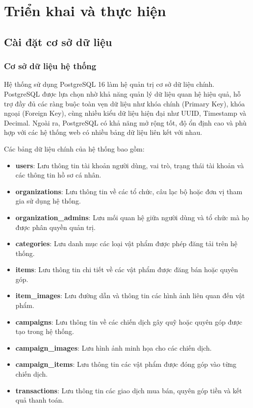\documentclass[12pt,a4paper]{report}
\begin{document}
\chapter{Triển khai và thực hiện}

\section{Cài đặt cơ sở dữ liệu}

\subsection{Cơ sở dữ liệu hệ thống}

Hệ thống sử dụng PostgreSQL 16 làm hệ quản trị cơ sở dữ liệu chính. PostgreSQL được lựa chọn nhờ khả năng quản lý dữ liệu quan hệ hiệu quả, hỗ trợ đầy đủ các ràng buộc toàn vẹn dữ liệu như khóa chính (Primary Key), khóa ngoại (Foreign Key), cùng nhiều kiểu dữ liệu hiện đại như UUID, Timestamp và Decimal. Ngoài ra, PostgreSQL có khả năng mở rộng tốt, độ ổn định cao và phù hợp với các hệ thống web có nhiều bảng dữ liệu liên kết với nhau.

Các bảng dữ liệu chính của hệ thống bao gồm:

\begin{itemize}[label=--, leftmargin=1.2cm]

\item \textbf{users}: Lưu thông tin tài khoản người dùng, vai trò, trạng thái tài khoản và các thông tin hồ sơ cá nhân.

\item \textbf{organizations}: Lưu thông tin về các tổ chức, câu lạc bộ hoặc đơn vị tham gia sử dụng hệ thống.

\item \textbf{organization\_admins}: Lưu mối quan hệ giữa người dùng và tổ chức mà họ được phân quyền quản trị.

\item \textbf{categories}: Lưu danh mục các loại vật phẩm được phép đăng tải trên hệ thống.

\item \textbf{items}: Lưu thông tin chi tiết về các vật phẩm được đăng bán hoặc quyên góp.

\item \textbf{item\_images}: Lưu đường dẫn và thông tin các hình ảnh liên quan đến vật phẩm.

\item \textbf{campaigns}: Lưu thông tin về các chiến dịch gây quỹ hoặc quyên góp được tạo trong hệ thống.

\item \textbf{campaign\_images}: Lưu hình ảnh minh họa cho các chiến dịch.

\item \textbf{campaign\_items}: Lưu thông tin các vật phẩm được đóng góp vào từng chiến dịch.

\item \textbf{transactions}: Lưu thông tin các giao dịch mua bán, quyên góp tiền và kết quả thanh toán.


\end{itemize}
\end{document}
